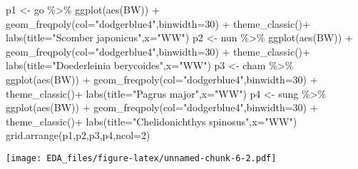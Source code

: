 \documentclass[
]{article}
\newenvironment{Shaded}{\begin{snugshade}}{\end{snugshade}}
\newcommand{\AttributeTok}[1]{\textcolor[rgb]{0.77,0.63,0.00}{#1}}
\newcommand{\DecValTok}[1]{\textcolor[rgb]{0.00,0.00,0.81}{#1}}
\newcommand{\FunctionTok}[1]{\textcolor[rgb]{0.00,0.00,0.00}{#1}}
\newcommand{\NormalTok}[1]{#1}
\newcommand{\OtherTok}[1]{\textcolor[rgb]{0.56,0.35,0.01}{#1}}
\newcommand{\SpecialCharTok}[1]{\textcolor[rgb]{0.00,0.00,0.00}{#1}}
\newcommand{\StringTok}[1]{\textcolor[rgb]{0.31,0.60,0.02}{#1}}
\begin{document}
\begin{Shaded}
\begin{Highlighting}[]
\NormalTok{p1 }\OtherTok{\textless{}{-}}\NormalTok{ go }\SpecialCharTok{\%\textgreater{}\%} \FunctionTok{ggplot}\NormalTok{(}\FunctionTok{aes}\NormalTok{(BW)) }\SpecialCharTok{+} \FunctionTok{geom\_freqpoly}\NormalTok{(}\AttributeTok{col=}\StringTok{"dodgerblue4"}\NormalTok{,}\AttributeTok{binwidth=}\DecValTok{30}\NormalTok{) }\SpecialCharTok{+} \FunctionTok{theme\_classic}\NormalTok{()}\SpecialCharTok{+} \FunctionTok{labs}\NormalTok{(}\AttributeTok{title=}\StringTok{"Scomber japonicus"}\NormalTok{,}\AttributeTok{x=}\StringTok{"WW"}\NormalTok{)}
\NormalTok{p2 }\OtherTok{\textless{}{-}}\NormalTok{ nun }\SpecialCharTok{\%\textgreater{}\%} \FunctionTok{ggplot}\NormalTok{(}\FunctionTok{aes}\NormalTok{(BW)) }\SpecialCharTok{+} \FunctionTok{geom\_freqpoly}\NormalTok{(}\AttributeTok{col=}\StringTok{"dodgerblue4"}\NormalTok{,}\AttributeTok{binwidth=}\DecValTok{30}\NormalTok{) }\SpecialCharTok{+} \FunctionTok{theme\_classic}\NormalTok{()}\SpecialCharTok{+} \FunctionTok{labs}\NormalTok{(}\AttributeTok{title=}\StringTok{"Doederleinia berycoides"}\NormalTok{,}\AttributeTok{x=}\StringTok{"WW"}\NormalTok{)}
\NormalTok{p3 }\OtherTok{\textless{}{-}}\NormalTok{ cham }\SpecialCharTok{\%\textgreater{}\%} \FunctionTok{ggplot}\NormalTok{(}\FunctionTok{aes}\NormalTok{(BW)) }\SpecialCharTok{+} \FunctionTok{geom\_freqpoly}\NormalTok{(}\AttributeTok{col=}\StringTok{"dodgerblue4"}\NormalTok{,}\AttributeTok{binwidth=}\DecValTok{30}\NormalTok{) }\SpecialCharTok{+} \FunctionTok{theme\_classic}\NormalTok{()}\SpecialCharTok{+} \FunctionTok{labs}\NormalTok{(}\AttributeTok{title=}\StringTok{"Pagrus major"}\NormalTok{,}\AttributeTok{x=}\StringTok{"WW"}\NormalTok{)}
\NormalTok{p4 }\OtherTok{\textless{}{-}}\NormalTok{ sung }\SpecialCharTok{\%\textgreater{}\%} \FunctionTok{ggplot}\NormalTok{(}\FunctionTok{aes}\NormalTok{(BW)) }\SpecialCharTok{+} \FunctionTok{geom\_freqpoly}\NormalTok{(}\AttributeTok{col=}\StringTok{"dodgerblue4"}\NormalTok{,}\AttributeTok{binwidth=}\DecValTok{30}\NormalTok{) }\SpecialCharTok{+} \FunctionTok{theme\_classic}\NormalTok{()}\SpecialCharTok{+} \FunctionTok{labs}\NormalTok{(}\AttributeTok{title=}\StringTok{"Chelidonichthys spinosus"}\NormalTok{,}\AttributeTok{x=}\StringTok{"WW"}\NormalTok{)}
\FunctionTok{grid.arrange}\NormalTok{(p1,p2,p3,p4,}\AttributeTok{ncol=}\DecValTok{2}\NormalTok{)}
\end{Highlighting}
\end{Shaded}

\texttt{[image: EDA\_files/figure-latex/unnamed-chunk-6-2.pdf]}
\end{document}
